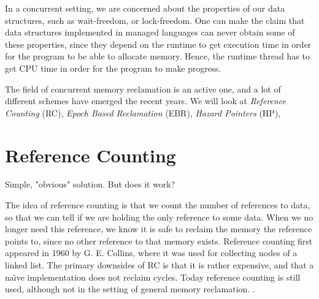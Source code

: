 \documentclass[a4paper,twoside]{report}
\begin{document}
In a concurrent setting, we are concerned about the properties of our data
structures,  such as wait-freedom, or lock-freedom.
 One can make the claim that data structures
implemented in managed languages can never obtain some of these properties,
since they depend on the runtime to get execution time in order for the program
to be able to allocate memory.  Hence, the runtime thread has to get CPU time
in order for the program to make progress.  

The field of concurrent memory reclamation is an active one, and a lot of
different schemes have emerged the recent years. We will look at
\emph{Reference Counting} (RC),
\emph{Epoch Based Reclamation} (EBR),
\emph{Hazard Pointers} (HP),




\section{Reference Counting}
Simple, "obvious" solution. But does it work?

 The idea of reference counting is that we count the number of references
to data, so that we can tell if we are holding the only reference to some
data.  When we no longer need this reference, we know it is safe to reclaim the
memory the reference points to, since no other reference to that memory
exists.  Reference counting first appeared in 1960 by G. E.
Collins\cite{collins1960method}, where it was used for collecting nodes of a
linked list.  The primary downsides of RC is that it is rather expensive, and
that a na\"\i{}ve implementation does not reclaim cycles.  Today reference
counting is still used, although not in the setting of general memory
reclamation.  .

%
\end{document}
